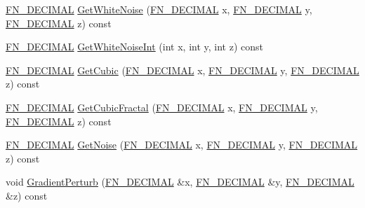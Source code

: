 \begin{DoxyCompactItemize}
\item 
\mbox{\hyperlink{_fast_noise_8h_a75a9ef6d2541c4921815b885bfd449c3}{F\+N\+\_\+\+D\+E\+C\+I\+M\+AL}} \mbox{\hyperlink{class_fast_noise_a661febd01ba99e06b9de5fab9bd13fb0}{Get\+White\+Noise}} (\mbox{\hyperlink{_fast_noise_8h_a75a9ef6d2541c4921815b885bfd449c3}{F\+N\+\_\+\+D\+E\+C\+I\+M\+AL}} x, \mbox{\hyperlink{_fast_noise_8h_a75a9ef6d2541c4921815b885bfd449c3}{F\+N\+\_\+\+D\+E\+C\+I\+M\+AL}} y, \mbox{\hyperlink{_fast_noise_8h_a75a9ef6d2541c4921815b885bfd449c3}{F\+N\+\_\+\+D\+E\+C\+I\+M\+AL}} z) const
\item 
\mbox{\hyperlink{_fast_noise_8h_a75a9ef6d2541c4921815b885bfd449c3}{F\+N\+\_\+\+D\+E\+C\+I\+M\+AL}} \mbox{\hyperlink{class_fast_noise_a1c0a782e7675a58f6fe777eb6fa06eaf}{Get\+White\+Noise\+Int}} (int x, int y, int z) const
\item 
\mbox{\hyperlink{_fast_noise_8h_a75a9ef6d2541c4921815b885bfd449c3}{F\+N\+\_\+\+D\+E\+C\+I\+M\+AL}} \mbox{\hyperlink{class_fast_noise_a08d9997db49e1f7d536a6502e29cb2b8}{Get\+Cubic}} (\mbox{\hyperlink{_fast_noise_8h_a75a9ef6d2541c4921815b885bfd449c3}{F\+N\+\_\+\+D\+E\+C\+I\+M\+AL}} x, \mbox{\hyperlink{_fast_noise_8h_a75a9ef6d2541c4921815b885bfd449c3}{F\+N\+\_\+\+D\+E\+C\+I\+M\+AL}} y, \mbox{\hyperlink{_fast_noise_8h_a75a9ef6d2541c4921815b885bfd449c3}{F\+N\+\_\+\+D\+E\+C\+I\+M\+AL}} z) const
\item 
\mbox{\hyperlink{_fast_noise_8h_a75a9ef6d2541c4921815b885bfd449c3}{F\+N\+\_\+\+D\+E\+C\+I\+M\+AL}} \mbox{\hyperlink{class_fast_noise_a5a3c112c87fc2d8ca89e16332538c71a}{Get\+Cubic\+Fractal}} (\mbox{\hyperlink{_fast_noise_8h_a75a9ef6d2541c4921815b885bfd449c3}{F\+N\+\_\+\+D\+E\+C\+I\+M\+AL}} x, \mbox{\hyperlink{_fast_noise_8h_a75a9ef6d2541c4921815b885bfd449c3}{F\+N\+\_\+\+D\+E\+C\+I\+M\+AL}} y, \mbox{\hyperlink{_fast_noise_8h_a75a9ef6d2541c4921815b885bfd449c3}{F\+N\+\_\+\+D\+E\+C\+I\+M\+AL}} z) const
\item 
\mbox{\hyperlink{_fast_noise_8h_a75a9ef6d2541c4921815b885bfd449c3}{F\+N\+\_\+\+D\+E\+C\+I\+M\+AL}} \mbox{\hyperlink{class_fast_noise_a0d9b7a6858a599cde4dc5b8f74264ae0}{Get\+Noise}} (\mbox{\hyperlink{_fast_noise_8h_a75a9ef6d2541c4921815b885bfd449c3}{F\+N\+\_\+\+D\+E\+C\+I\+M\+AL}} x, \mbox{\hyperlink{_fast_noise_8h_a75a9ef6d2541c4921815b885bfd449c3}{F\+N\+\_\+\+D\+E\+C\+I\+M\+AL}} y, \mbox{\hyperlink{_fast_noise_8h_a75a9ef6d2541c4921815b885bfd449c3}{F\+N\+\_\+\+D\+E\+C\+I\+M\+AL}} z) const
\item 
void \mbox{\hyperlink{class_fast_noise_a24007877680a6d0f45ea1d7f209ee6f1}{Gradient\+Perturb}} (\mbox{\hyperlink{_fast_noise_8h_a75a9ef6d2541c4921815b885bfd449c3}{F\+N\+\_\+\+D\+E\+C\+I\+M\+AL}} \&x, \mbox{\hyperlink{_fast_noise_8h_a75a9ef6d2541c4921815b885bfd449c3}{F\+N\+\_\+\+D\+E\+C\+I\+M\+AL}} \&y, \mbox{\hyperlink{_fast_noise_8h_a75a9ef6d2541c4921815b885bfd449c3}{F\+N\+\_\+\+D\+E\+C\+I\+M\+AL}} \&z) const

\end{DoxyCompactItemize}
